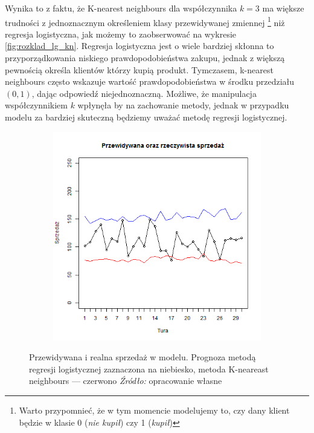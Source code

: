 \documentclass[polish, twoside, 12pt, a4paper]{article}
\theoremstyle{definition}
\theoremstyle{plain}
\theoremstyle{remark}
\begin{document}
Wynika to z faktu, że K-nearest neighbours dla współczynnika $k=3$ ma większe trudności z jednoznacznym określeniem klasy przewidywanej zmiennej \footnote{Warto przypomnieć, że w tym momencie modelujemy to, czy dany klient będzie w klasie 0 (\textit{nie kupił}) czy 1 (\textit{kupił})} niż regresja logistyczna, jak możemy to zaobserwować na wykresie \ref{fig:rozklad_lg_kn}. Regresja logistyczna jest o wiele bardziej skłonna to przyporządkowania niskiego prawdopodobieństwa zakupu, jednak z większą pewnością określa klientów którzy kupią produkt. Tymczasem, k-nearest neighbours często wskazuje wartość prawdopodobieństwa w środku przedziału $(0,1)$, dając odpowiedź niejednoznaczną. Możliwe, że manipulacja współczynnikiem $k$ wpłynęła by na zachowanie metody, jednak w przypadku modelu za bardziej skuteczną będziemy uważać metodę regresji logistycznej. 

\begin{figure}[hbt]
  \centering

  \begin{subfigure}[t]{0.45\textwidth}
    \includegraphics[width=\textwidth]{pictures/prognozy_lg_kn.png}
  \end{subfigure}
  \captionsetup{margin=10pt,font=small,labelfont=bf,width=.8\textwidth}

  \caption[Przewidywana i realna sprzedaż w modelu]{Przewidywana i realna sprzedaż w modelu. Prognoza metodą regresji logistycznej zaznaczona na niebiesko, metoda K-neareast neighbours --- czerwono \textit{Źródło:} opracowanie własne}\label{fig:lg_kn}
\end{figure}
\end{document}
